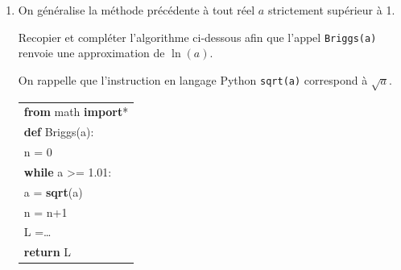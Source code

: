 \begin{enumerate}
On décide de prendre $x - 1$ comme approximation de $\ln (x)$ lorsque $x$ appartient à l'intervalle $]0,99~;~1,01[$.

	\begin{enumerate}
		\item Déterminer à l'aide de la calculatrice le plus petit entier naturel $k$ tel que $u_{k}$ appartienne à l'intervalle $]0,99 ~;~1,01[$ et donner une valeur approchée de $u_{k}$ à $10^{-5}$ près.
		\item En déduire une approximation de $\ln \left(u_{k}\right)$.
\item Déduire des questions \textbf{1. c.} et \textbf{2. b.} de la \textbf{partie B} une approximation de $\ln (2)$.
	\end{enumerate}

\item On généralise la méthode précédente à tout réel $a$ strictement supérieur à 1.

Recopier et compléter l'algorithme ci-dessous afin que l'appel \texttt{Briggs(a)} renvoie une approximation de $\ln (a)$.

On rappelle que l'instruction en langage Python \texttt{sqrt(a)} correspond à $\sqrt{a}$.

\begin{center}
\begin{ttfamily}
\begin{tabularx}{8cm}{|X|}\hline
\textbf{from} math \textbf{import}*\\
\textbf{def} Briggs(a):\\
\quad n = 0\\
\quad \textbf{while} a >= 1.01:\\
	\quad \quad a = \textbf{sqrt}(a)\\
	\quad \quad n = n+1\\
	\quad L =\dots\\
	\textbf{return} L\\ \hline
	\end{tabularx}
	\end{ttfamily}
\end{center}
\end{enumerate}



\bigskip
